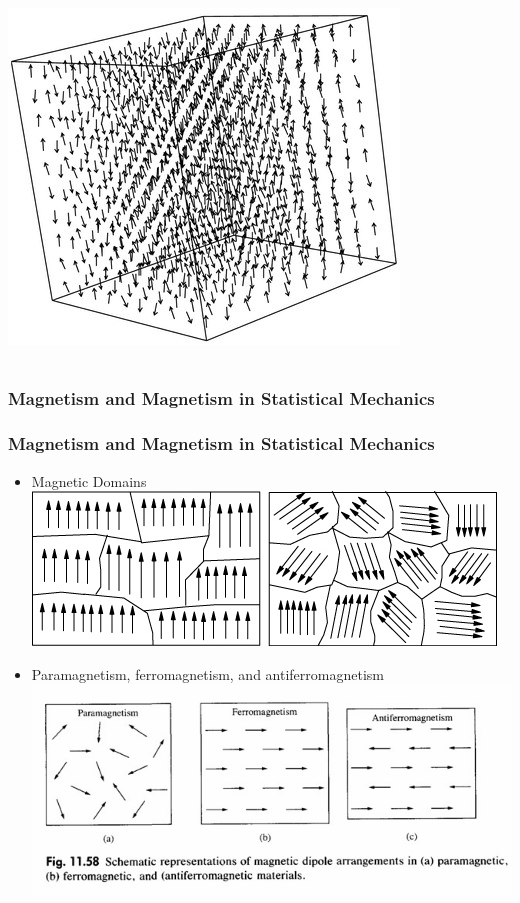 \documentclass{beamer}
\begin{document}
\begin{frame}
\begin{columns}[t]
\begin{column}[T]{6cm}
    		\includegraphics[scale=0.4]{lattice}
    	\end{column}
    	\end{columns}
  \end{frame}
  \subsubsection*{Magnetism and Magnetism in Statistical Mechanics}
  \begin{frame}
    \frametitle{Magnetism and Magnetism in Statistical Mechanics}
    	\begin{itemize}
    		\item Magnetic Domains \\
    					\includegraphics[scale=0.5]{domains}
    		\item Paramagnetism, ferromagnetism, and antiferromagnetism \\
    					\includegraphics[scale=0.3]{ferro_para_anti}
    	\end{itemize}
  \end{frame}
\end{document}
